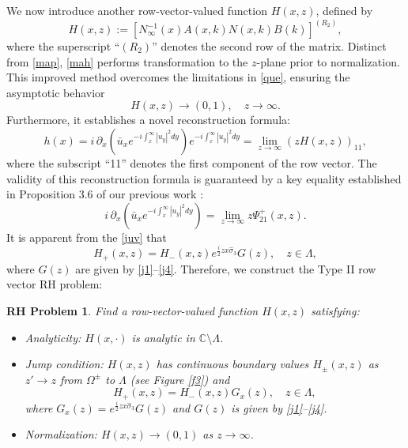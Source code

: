 \documentclass[preprint,compress,12pt]{elsarticle}
\newtheorem{rhp}{RH Problem}
\numberwithin{equation}{section}
\begin{document}
We now introduce another row-vector-valued function $H(x,z)$, defined by
\begin{equation}\label{mah}
H(x,z):=\left[N_{\infty}^{-1}(x)A(x,k)N(x,k)B(k)\right]^{(R_{2})},
\end{equation}
where the superscript ``$(R_{2})$'' denotes the second row of the matrix. Distinct from \eqref{map}, \eqref{mah} performs transformation to the $z$-plane prior to normalization. This improved method overcomes the limitations in \eqref{que}, ensuring the asymptotic behavior
\begin{equation}
 H(x,z)\rightarrow (0,1),\quad z\rightarrow\infty.
 \end{equation}
Furthermore, it establishes a novel reconstruction formula:
\begin{equation}\label{sfs}
h(x)=i\,\partial_{x}\left(\bar{u}_{x}e^{-i\int_{x}^{\infty}|u_{y}|^{2}dy}\right)e^{-i\int_{x}^{\infty}|u_{y}|^{2}dy}=\lim\limits_{z\rightarrow\infty}\left(zH\left(x,z\right)\right)_{11},
\end{equation}
where the subscript ``11'' denotes the first component of the row vector. The validity of this reconstruction formula is guaranteed by a key equality established in Proposition 3.6 of our previous work \cite{Chengglo}:
\begin{equation}\label{asjk}
i\,\partial_{x}\left(\bar{u}_{x}e^{-i\int_{x}^{\infty}|u_{y}|^{2}dy}\right)=\lim_{z\rightarrow\infty}z\Psi_{21}^{+}(x,z).
\end{equation}
It is apparent from the \eqref{juv} that
\begin{equation}
H_{+}(x,z)=H_{-}(x,z)e^{\frac{i}{2}zx\widehat{\sigma}_{3}}G(z),\quad z\in\Lambda,
\end{equation}
where $G(z)$ are given by \eqref{j1}--\eqref{j4}. Therefore, we construct the Type II row vector RH problem:
\begin{rhp}\label{RH3}
Find a row-vector-valued function $H(x,z)$ satisfying:
\begin{itemize}
  \item Analyticity: $H(x,\cdot)$ is analytic in $\mathbb{C}\setminus\Lambda$.
  \item Jump condition:
  $H(x,z)$ has continuous boundary values $H_{\pm}(x,z)$ as $z'\rightarrow z$ from $\Omega^{\pm}$ to $\Lambda$ (see Figure \ref{f3}) and
      \begin{equation}
      H_{+}(x,z)=H_{-}(x,z)G_{x}(z),\quad z\in\Lambda,
      \end{equation}
      where $G_{x}(z)=e^{\frac{i}{2}zx\widehat{\sigma}_{3}}G(z)$ and $G(z)$ is given by \eqref{j1}--\eqref{j4}.
  \item Normalization: $H(x,z)\rightarrow (0,1)$ as $z\rightarrow\infty$.
\end{itemize}
\end{rhp}
\end{document}
